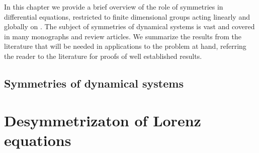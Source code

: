 
In this chapter we provide a brief overview of the role of
symmetries in differential equations, restricted to finite
dimensional groups acting linearly and globally on . The
subject of symmetries of dynamical systems is vast and covered
in many monographs and review articles. We summarize the
results from the literature that will be needed in applications
to the problem at hand, referring the reader to the literature
for proofs of well established results.

 \section{Symmetries of dynamical systems}
        \label{sec:symIntro}
        



\chapter{Desymmetrizaton of Lorenz equations}
\label{chap:Lorenz}
    


